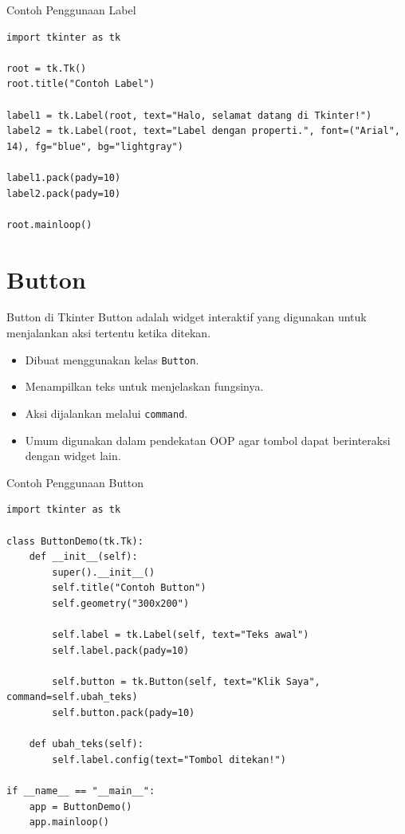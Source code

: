 \documentclass[aspectratio=169, table]{beamer}
\begin{document}
\begin{frame}[fragile]{Contoh Penggunaan Label}
\vspace{20pt}
\begin{lstlisting}[style=PythonStyle]
import tkinter as tk

root = tk.Tk()
root.title("Contoh Label")

label1 = tk.Label(root, text="Halo, selamat datang di Tkinter!")
label2 = tk.Label(root, text="Label dengan properti.", font=("Arial", 14), fg="blue", bg="lightgray")

label1.pack(pady=10)
label2.pack(pady=10)

root.mainloop()
\end{lstlisting}
\end{frame}


\section{Button}
\begin{frame}[fragile]{Button di Tkinter}
\vspace{20pt}
Button adalah widget interaktif yang digunakan untuk menjalankan aksi tertentu ketika ditekan.  

\begin{itemize}
    \item Dibuat menggunakan kelas \texttt{Button}.
    \item Menampilkan teks untuk menjelaskan fungsinya.
    \item Aksi dijalankan melalui \texttt{command}.
    \item Umum digunakan dalam pendekatan OOP agar tombol dapat berinteraksi dengan widget lain.
\end{itemize}
\end{frame}

\begin{frame}[fragile]{Contoh Penggunaan Button}
\vspace{20pt}
\begin{lstlisting}[style=PythonStyle, basicstyle=\ttfamily\scriptsize]
import tkinter as tk

class ButtonDemo(tk.Tk):
    def __init__(self):
        super().__init__()
        self.title("Contoh Button")
        self.geometry("300x200")

        self.label = tk.Label(self, text="Teks awal")
        self.label.pack(pady=10)

        self.button = tk.Button(self, text="Klik Saya", command=self.ubah_teks)
        self.button.pack(pady=10)

    def ubah_teks(self):
        self.label.config(text="Tombol ditekan!")

if __name__ == "__main__":
    app = ButtonDemo()
    app.mainloop()
\end{lstlisting}
\end{frame}
\end{document}
